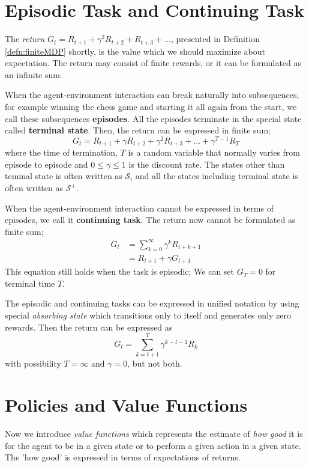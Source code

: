 \documentclass[../../main.tex]{subfiles}
\begin{document}
\section{Episodic Task and Continuing Task}
    The \emph{return} $G_t=R_{t+1} + \gamma^2R_{t+2} + R_{t+3} + \dots$, presented in Definition \ref{defn:finiteMDP} shortly, is the value which we should maximize about expectation.
    The return may consist of finite rewards, or it can be formulated as an infinite sum.
    
    When the agent-environment interaction can break naturally into subsequences, for example winning the chess game and starting it all again from the start,
    we call these subsequences \textbf{episodes}. All the episodes terminate in the special state called \textbf{terminal state}.
    Then, the return can be expressed in finite sum;
    \[
    G_t = R_{t+1} + \gamma R_{t+2} + \gamma^2 R_{t+3} + \dots + \gamma^{T-1}R_T
    \] 
    where the time of termination, $T$ is a random variable that normally varies from episode to episode and $0 \leq \gamma \leq 1$ is the discount rate.
    The states other than teminal state is often written as $\mathcal{S}$, and all the states including terminal state is often written as $\mathcal{S}^+$.

    When the agent-environment interaction cannot be expressed in terms of episodes, we call it \textbf{continuing task}. The return now cannot be formulated as finite sum;
    \begin{align}
        G_t &= \sum_{k=0}^{\infty}\gamma^k R_{t+k+1} \\
            &= R_{t+1} + \gamma G_{t+1}
    \end{align}
    This equation still holds when the task is episodic; We can set $G_T=0$ for terminal time $T$.

    The episodic and continuing tasks can be expressed in unified notation by using special \emph{absorbing state} which transitions only to itself and generates only zero rewards.
    Then the return can be expressed as
    \[
    G_t = \sum_{k=t+1}^{T}\gamma^{k-t-1}R_k
    \]
    with possibility $T=\infty$ and $\gamma = 0$, but not both.

\section{Policies and Value Functions}
    Now we introduce \emph{value functions} which represents the estimate of \emph{how good} it is for the agent to be in a given state
    or to perform a given action in a given state. The 'how good' is expressed in terms of expectations of returns.
\end{document}
